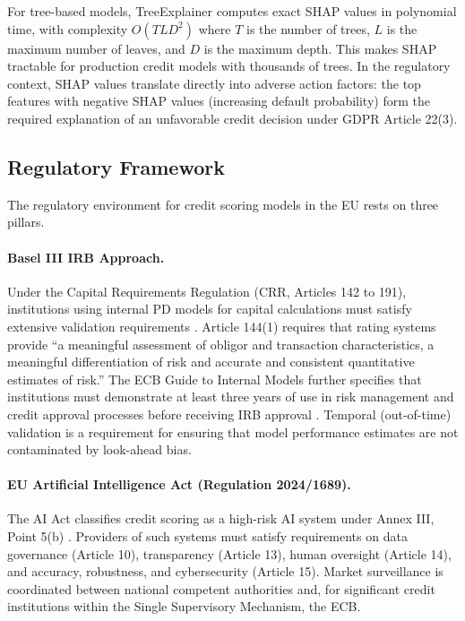 \documentclass[11pt, a4paper]{article}
\begin{document}
For tree-based models, TreeExplainer computes exact SHAP values in polynomial time, with complexity $O(TLD^2)$ where $T$ is the number of trees, $L$ is the maximum number of leaves, and $D$ is the maximum depth. This makes SHAP tractable for production credit models with thousands of trees. In the regulatory context, SHAP values translate directly into adverse action factors: the top features with negative SHAP values (increasing default probability) form the required explanation of an unfavorable credit decision under GDPR Article 22(3).

\subsection{Regulatory Framework}
\label{subsec:regulatory_framework}

The regulatory environment for credit scoring models in the EU rests on three pillars.

\paragraph{Basel III IRB Approach.} Under the Capital Requirements Regulation (CRR, Articles 142 to 191), institutions using internal PD models for capital calculations must satisfy extensive validation requirements \parencite{crr_irb_2013}. Article 144(1) requires that rating systems provide ``a meaningful assessment of obligor and transaction characteristics, a meaningful differentiation of risk and accurate and consistent quantitative estimates of risk.'' The ECB Guide to Internal Models further specifies that institutions must demonstrate at least three years of use in risk management and credit approval processes before receiving IRB approval \parencite{ssm_guide_2025}. Temporal (out-of-time) validation is a requirement for ensuring that model performance estimates are not contaminated by look-ahead bias.

\paragraph{EU Artificial Intelligence Act (Regulation 2024/1689).} The AI Act classifies credit scoring as a high-risk AI system under Annex III, Point 5(b) \parencite{eu_ai_act_2024_1689}. Providers of such systems must satisfy requirements on data governance (Article 10), transparency (Article 13), human oversight (Article 14), and accuracy, robustness, and cybersecurity (Article 15). Market surveillance is coordinated between national competent authorities and, for significant credit institutions within the Single Supervisory Mechanism, the ECB.
\end{document}
